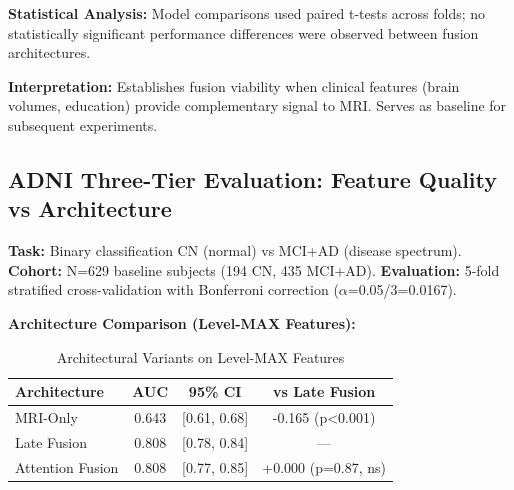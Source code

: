 \documentclass[conference]{IEEEtran}
\begin{document}
\textbf{Statistical Analysis:} Model comparisons used paired t-tests across folds; no statistically significant performance differences were observed between fusion architectures.

\textbf{Interpretation:} Establishes fusion viability when clinical features (brain volumes, education) provide complementary signal to MRI. Serves as baseline for subsequent experiments.

\subsection{ADNI Three-Tier Evaluation: Feature Quality vs Architecture}

\textbf{Task:} Binary classification CN (normal) vs MCI+AD (disease spectrum).  
\textbf{Cohort:} N=629 baseline subjects (194 CN, 435 MCI+AD).  
\textbf{Evaluation:} 5-fold stratified cross-validation with Bonferroni correction ($\alpha$=0.05/3=0.0167).

\begin{table}[h]
\centering
\caption{ADNI Feature Tier Ablation Study}
\label{tab:adni-tiers}
\small
{}
\end{table}

\textbf{Architecture Comparison (Level-MAX Features):}

\begin{table}[h]
\centering
\caption{Architectural Variants on Level-MAX Features}
\label{tab:arch-comp}
\begin{tabular}{lccc}
\toprule
\textbf{Architecture} & \textbf{AUC} & \textbf{95\% CI} & \textbf{vs Late Fusion} \\
\midrule
MRI-Only & 0.643 & [0.61, 0.68] & -0.165 (p<0.001) \\
Late Fusion & 0.808 & [0.78, 0.84] & — \\
Attention Fusion & 0.808 & [0.77, 0.85] & +0.000 (p=0.87, ns) \\
\bottomrule
\end{tabular}
\end{table}
\end{document}

